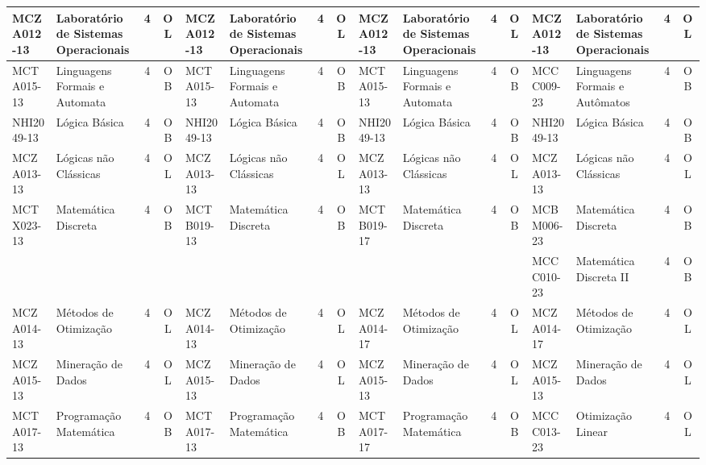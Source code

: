 \documentclass[a4paper]{article}
\begin{document}
\begin{landscape}
{\begin{longtable}{|l|p{.15\textheight}|c|c||l|p{.15\textheight}|c|c||l|p{.15\textheight}|c|c||l|p{.15\textheight}|c|c|}
    MCZA012-13 & Laboratório de Sistemas Operacionais & 4 & OL &
    MCZA012-13 & Laboratório de Sistemas Operacionais & 4 & OL &
    MCZA012-13 & Laboratório de Sistemas Operacionais & 4 & OL & 
    MCZA012-13 & Laboratório de Sistemas Operacionais & 4 & OL \\ \hline

    MCTA015-13 & Linguagens Formais e Automata  & 4 & OB &
    MCTA015-13 & Linguagens Formais e Automata  & 4 & OB &
    MCTA015-13 & Linguagens Formais e Automata  & 4 & OB &
    MCCC009-23 & Linguagens Formais e Autômatos & 4 & OB\\ \hline

    NHI2049-13 & Lógica Básica & 4 & OB &
    NHI2049-13 & Lógica Básica & 4 & OB &
    NHI2049-13 & Lógica Básica & 4 & OB &
    NHI2049-13 & Lógica Básica & 4 & OB \\ \hline

    MCZA013-13 & Lógicas não Clássicas & 4 & OL &
    MCZA013-13 & Lógicas não Clássicas & 4 & OL &
    MCZA013-13 & Lógicas não Clássicas & 4 & OL &
    MCZA013-13 & Lógicas não Clássicas & 4 & OL \\ \hline

    MCTX023-13 & Matemática Discreta & 4 & OB &
    MCTB019-13 & Matemática Discreta & 4 & OB &
    MCTB019-17 & Matemática Discreta & 4 & OB &
    MCBM006-23 & Matemática Discreta & 4 & OB\\ \hline

    & & & &
    & & & &
    & & & &
    MCCC010-23 & Matemática Discreta II & 4 & OB\\ \hline

    MCZA014-13 & Métodos de Otimização & 4 & OL &
    MCZA014-13 & Métodos de Otimização & 4 & OL &
    MCZA014-17 & Métodos de Otimização & 4 & OL &
    MCZA014-17 & Métodos de Otimização & 4 & OL \\ \hline

    MCZA015-13 & Mineração de Dados & 4 & OL &
    MCZA015-13 & Mineração de Dados & 4 & OL &
    MCZA015-13 & Mineração de Dados & 4 & OL &
    MCZA015-13 & Mineração de Dados & 4 & OL \\ \hline

    MCTA017-13 & Programação Matemática & 4 & OB &
    MCTA017-13 & Programação Matemática & 4 & OB &
    MCTA017-17 & Programação Matemática & 4 & OB &
    MCCC013-23 & Otimização Linear & 4 & OL\\ \hline


\end{longtable}}
\end{landscape}
\end{document}
